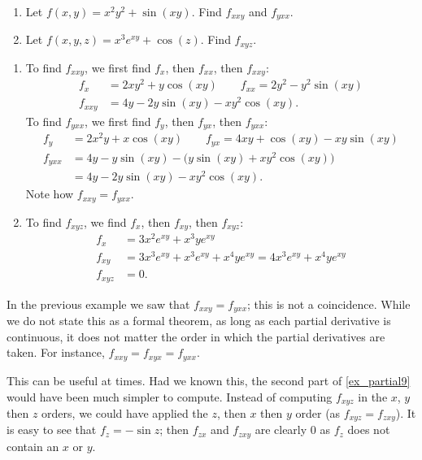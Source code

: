 \begin{example}\label{ex_partial9}
\mbox{}\\[-2\baselineskip]\parbox[t]{\linewidth}{\begin{enumerate}
	\item Let $f(x,y) = x^2y^2+\sin(xy)$. Find $f_{xxy}$ and $f_{yxx}$. 
	\item Let $f(x,y,z) = x^3e^{xy}+\cos(z)$. Find $f_{xyz}$.
\end{enumerate}}\vspace{0pt}
\solution
\begin{enumerate}
	\item To find $f_{xxy}$, we first find $f_x$, then $f_{xx}$, then $f_{xxy}$:
	\begin{align*}
	f_x &= 2xy^2+y\cos(xy) \quad\quad f_{xx} = 2y^2-y^2\sin(xy)\\
	f_{xxy} &= 4y-2y\sin(xy) - xy^2\cos(xy).
	\end{align*}
	To find $f_{yxx}$, we first find $f_y$, then $f_{yx}$, then $f_{yxx}$:
	\begin{align*}
	f_y &= 2x^2y+x\cos(xy) \quad \quad f_{yx} = 4xy + \cos(xy) - xy\sin(xy)\\
	f_{yxx} &= 4y-y\sin(xy) - \bigl(y\sin(xy) + xy^2\cos(xy)\bigr)\\ &= 4y-2y\sin(xy)-xy^2\cos(xy).
	\end{align*}
	Note how $f_{xxy} = f_{yxx}$.
	
	\item		To find $f_{xyz}$, we find $f_x$, then $f_{xy}$, then $f_{xyz}$:
	\begin{align*}
	f_x &= 3x^2e^{xy}+ x^3ye^{xy} \\
	f_{xy} & = 3x^3e^{xy}+x^3e^{xy}+x^4ye^{xy} = 4x^3e^{xy}+x^4ye^{xy}\\
	f_{xyz} &= 0.
	\end{align*}
\end{enumerate}
\end{example}

In the previous example we saw that $f_{xxy} = f_{yxx}$; this is not a coincidence. While we do not state this as a formal theorem, as long as each partial derivative is continuous, it does not matter the order in which the partial derivatives are taken. For instance, $f_{xxy} = f_{xyx} = f_{yxx}$. 

This can be useful at times. Had we known this, the second part of \autoref{ex_partial9} would have been much simpler to compute. Instead of computing $f_{xyz}$ in the $x$, $y$ then $z$ orders, we could have applied the $z$, then $x$ then $y$ order (as $f_{xyz} = f_{zxy}$). It is easy to see that $f_z = -\sin z$; then $f_{zx}$ and $f_{zxy}$ are clearly 0 as $f_z$ does not contain an $x$ or $y$.\bigskip

